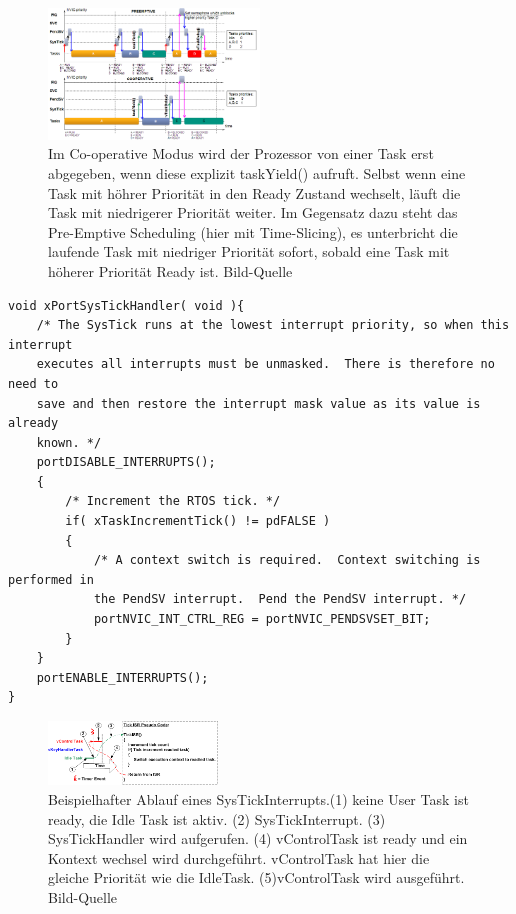 \begin{figure}[htb]
	\centering
		\includegraphics[width=0.5\textwidth]{Pictures/EMCUIT/PreemptiveCooperative.png}
	\caption{Im Co-operative Modus wird der Prozessor von einer Task erst abgegeben, wenn diese explizit taskYield() aufruft. Selbst wenn eine Task mit höhrer Priorität in den Ready Zustand wechselt, läuft die Task mit niedrigerer Priorität weiter. Im Gegensatz dazu steht das Pre-Emptive Scheduling (hier mit Time-Slicing), es unterbricht die laufende Task mit niedriger Priorität sofort, sobald eine Task mit höherer Priorität Ready ist. Bild-Quelle~\protect{}}
	\label{fig:PreVSCo}
\end{figure}
\begin{lstlisting}[caption={FreeRTOS Source des SysTickHandlers aus Task.c. Der SysTickHandler verwaltet den TickCount. Der TickCount dient allen Timingfunktionen des RTOS Kernels als Zeitreferenz. Des Weiteren wird bei aktivem Time Slicing überprüft ob ein Kontextwechsel nötig ist. Der Kontext wechsel wir dann ggf. durch den PendSVHandler durchgeführt.}, linewidth=8cm,captionpos=b, label=lst:SysTickS, float=hbt]
void xPortSysTickHandler( void ){
	/* The SysTick runs at the lowest interrupt priority, so when this interrupt
	executes all interrupts must be unmasked.  There is therefore no need to
	save and then restore the interrupt mask value as its value is already
	known. */
	portDISABLE_INTERRUPTS();
	{
		/* Increment the RTOS tick. */
		if( xTaskIncrementTick() != pdFALSE )
		{
			/* A context switch is required.  Context switching is performed in
			the PendSV interrupt.  Pend the PendSV interrupt. */
			portNVIC_INT_CTRL_REG = portNVIC_PENDSVSET_BIT;
		}
	}
	portENABLE_INTERRUPTS();
}
\end{lstlisting}
\begin{figure}[htb]
	\centering
		\includegraphics[width=0.4\textwidth]{Pictures/FreeRTOSOrg/TickISR.png}
	\caption{Beispielhafter Ablauf eines SysTickInterrupts.(1) keine User Task ist ready, die Idle Task ist aktiv. (2) SysTickInterrupt. (3) SysTickHandler wird aufgerufen. (4) vControlTask ist ready und ein Kontext wechsel wird durchgeführt. vControlTask hat hier die gleiche Priorität wie die IdleTask. (5)vControlTask wird ausgeführt. Bild-Quelle~\protect{}}
	\label{fig:SysTick}
\end{figure}


